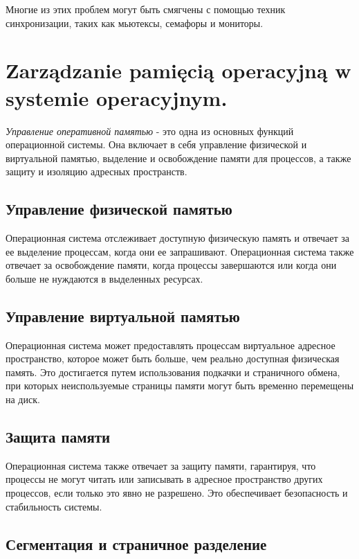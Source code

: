 Многие из этих проблем могут быть смягчены с помощью техник синхронизации, таких как мьютексы, семафоры и мониторы.


\section{Zarządzanie pamięcią operacyjną w systemie operacyjnym.}

\textit{Управление оперативной памятью} - это одна из основных функций операционной системы. Она включает в себя управление физической и виртуальной памятью, выделение и освобождение памяти для процессов, а также защиту и изоляцию адресных пространств.

\subsection{Управление физической памятью}

Операционная система отслеживает доступную физическую память и отвечает за ее выделение процессам, когда они ее запрашивают. Операционная система также отвечает за освобождение памяти, когда процессы завершаются или когда они больше не нуждаются в выделенных ресурсах.

\subsection{Управление виртуальной памятью}

Операционная система может предоставлять процессам виртуальное адресное пространство, которое может быть больше, чем реально доступная физическая память. Это достигается путем использования подкачки и страничного обмена, при которых неиспользуемые страницы памяти могут быть временно перемещены на диск.

\subsection{Защита памяти}

Операционная система также отвечает за защиту памяти, гарантируя, что процессы не могут читать или записывать в адресное пространство других процессов, если только это явно не разрешено. Это обеспечивает безопасность и стабильность системы.

\subsection{Сегментация и страничное разделение}

